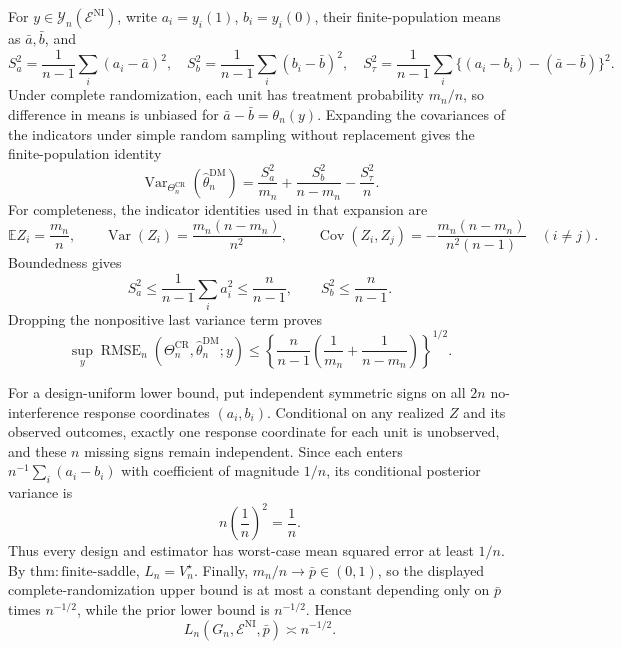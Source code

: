 For \(y\in\mathcal Y_n(\mathcal E^{\mathrm{NI}})\), write \(a_i=y_i(1)\), \(b_i=y_i(0)\), their finite-population means as \(\bar a,\bar b\), and
\[
 S_a^2=\frac1{n-1}\sum_i(a_i-\bar a)^2,
 \quad
 S_b^2=\frac1{n-1}\sum_i(b_i-\bar b)^2,
 \quad
 S_\tau^2=\frac1{n-1}\sum_i\{(a_i-b_i)-(\bar a-\bar b)\}^2.
\]
Under complete randomization, each unit has treatment probability \(m_n/n\), so difference in means is unbiased for \(\bar a-\bar b=\theta_n(y)\).  Expanding the covariances of the indicators under simple random sampling without replacement gives the finite-population identity
\[
 \operatorname{Var}_{\Theta_n^{\mathrm{CR}}}(\widehat\theta_n^{\mathrm{DM}})
 =\frac{S_a^2}{m_n}+\frac{S_b^2}{n-m_n}-\frac{S_\tau^2}{n}.
\]
For completeness, the indicator identities used in that expansion are
\[
 \mathbb E Z_i=\frac{m_n}{n},\qquad
 \operatorname{Var}(Z_i)=\frac{m_n(n-m_n)}{n^2},\qquad
 \operatorname{Cov}(Z_i,Z_j)=-\frac{m_n(n-m_n)}{n^2(n-1)}\quad(i\ne j).
\]
Boundedness gives
\[
 S_a^2\le\frac1{n-1}\sum_i a_i^2\le\frac n{n-1},
 \qquad
 S_b^2\le\frac n{n-1}.
\]
Dropping the nonpositive last variance term proves
\[
 \sup_y\operatorname{RMSE}_n(\Theta_n^{\mathrm{CR}},\widehat\theta_n^{\mathrm{DM}};y)
 \le
 \left\{\frac n{n-1}\left(\frac1{m_n}+\frac1{n-m_n}\right)\right\}^{1/2}.
\]

For a design-uniform lower bound, put independent symmetric signs on all \(2n\) no-interference response coordinates \((a_i,b_i)\).  Conditional on any realized \(Z\) and its observed outcomes, exactly one response coordinate for each unit is unobserved, and these \(n\) missing signs remain independent.  Since each enters \(n^{-1}\sum_i(a_i-b_i)\) with coefficient of magnitude \(1/n\), its conditional posterior variance is
\[
 n\left(\frac1n\right)^2=\frac1n.
\]
Thus every design and estimator has worst-case mean squared error at least \(1/n\).  By \(\mathrm{thm{:}finite\text{-}saddle}\), \(L_n=V_n^\star\).  Finally, \(m_n/n\to\bar p\in(0,1)\), so the displayed complete-randomization upper bound is at most a constant depending only on \(\bar p\) times \(n^{-1/2}\), while the prior lower bound is \(n^{-1/2}\).  Hence
\[
 L_n(G_n,\mathcal E^{\mathrm{NI}},\bar p)\asymp n^{-1/2}.
\]